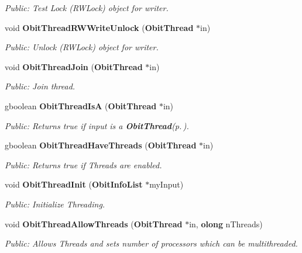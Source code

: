 \begin{CompactItemize}
\begin{CompactList}\small\item\em Public: Test Lock (RWLock) object for writer. \item\end{CompactList}\item 
void {\bf Obit\-Thread\-RWWrite\-Unlock} ({\bf Obit\-Thread} $\ast$in)
\begin{CompactList}\small\item\em Public: Unlock (RWLock) object for writer. \item\end{CompactList}\item 
void {\bf Obit\-Thread\-Join} ({\bf Obit\-Thread} $\ast$in)
\begin{CompactList}\small\item\em Public: Join thread. \item\end{CompactList}\item 
gboolean {\bf Obit\-Thread\-Is\-A} ({\bf Obit\-Thread} $\ast$in)
\begin{CompactList}\small\item\em Public: Returns true if input is a {\bf Obit\-Thread}{\rm (p.\,\pageref{structObitThread})}. \item\end{CompactList}\item 
gboolean {\bf Obit\-Thread\-Have\-Threads} ({\bf Obit\-Thread} $\ast$in)
\begin{CompactList}\small\item\em Public: Returns true if Threads are enabled. \item\end{CompactList}\item 
void {\bf Obit\-Thread\-Init} ({\bf Obit\-Info\-List} $\ast$my\-Input)
\begin{CompactList}\small\item\em Public: Initialize Threading. \item\end{CompactList}\item 
void {\bf Obit\-Thread\-Allow\-Threads} ({\bf Obit\-Thread} $\ast$in, {\bf olong} n\-Threads)
\begin{CompactList}\small\item\em Public: Allows Threads and sets number of processors which can be multithreaded. \item\end{CompactList}\item 

\end{CompactItemize}
